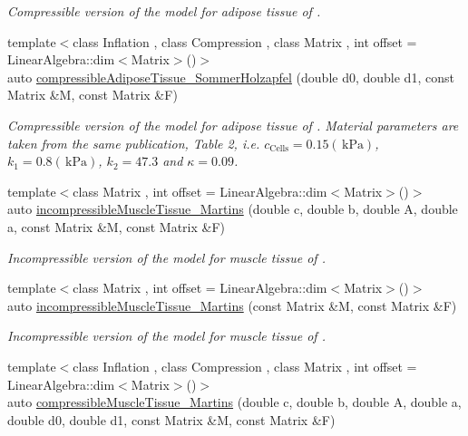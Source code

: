 \begin{DoxyCompactItemize}
\begin{DoxyCompactList}\small\item\em Compressible version of the model for adipose tissue of \cite{Sommer2013}. \end{DoxyCompactList}\item 
{\footnotesize template$<$class Inflation , class Compression , class Matrix , int offset = Linear\-Algebra\-::dim$<$\-Matrix$>$()$>$ }\\auto \hyperlink{group__Biomechanics_ga3d3cb526ca5269746febe677b2ea04a4}{compressible\-Adipose\-Tissue\-\_\-\-Sommer\-Holzapfel} (double d0, double d1, const Matrix \&M, const Matrix \&F)
\begin{DoxyCompactList}\small\item\em Compressible version of the model for adipose tissue of \cite{Sommer2013}. Material parameters are taken from the same publication, Table 2, i.\-e. $c_\mathrm{Cells}=0.15 (\,\mathrm{kPa})$, $k_1=0.8 (\,\mathrm{kPa})$, $k_2=47.3$ and $\kappa=0.09$. \end{DoxyCompactList}\item 
{\footnotesize template$<$class Matrix , int offset = Linear\-Algebra\-::dim$<$\-Matrix$>$()$>$ }\\auto \hyperlink{group__Biomechanics_gaeaaf9e9eccfecfa8503cdf4dbb393e21}{incompressible\-Muscle\-Tissue\-\_\-\-Martins} (double c, double b, double A, double a, const Matrix \&M, const Matrix \&F)
\begin{DoxyCompactList}\small\item\em Incompressible version of the model for muscle tissue of \cite{Martins1998}. \end{DoxyCompactList}\item 
{\footnotesize template$<$class Matrix , int offset = Linear\-Algebra\-::dim$<$\-Matrix$>$()$>$ }\\auto \hyperlink{group__Biomechanics_ga84c71caab50eced9ca7e6d3d323c57e1}{incompressible\-Muscle\-Tissue\-\_\-\-Martins} (const Matrix \&M, const Matrix \&F)
\begin{DoxyCompactList}\small\item\em Incompressible version of the model for muscle tissue of \cite{Martins1998}. \end{DoxyCompactList}\item 
{\footnotesize template$<$class Inflation , class Compression , class Matrix , int offset = Linear\-Algebra\-::dim$<$\-Matrix$>$()$>$ }\\auto \hyperlink{group__Biomechanics_gabe40c595a6752c8cbd8680123f984734}{compressible\-Muscle\-Tissue\-\_\-\-Martins} (double c, double b, double A, double a, double d0, double d1, const Matrix \&M, const Matrix \&F)

\end{DoxyCompactItemize}
